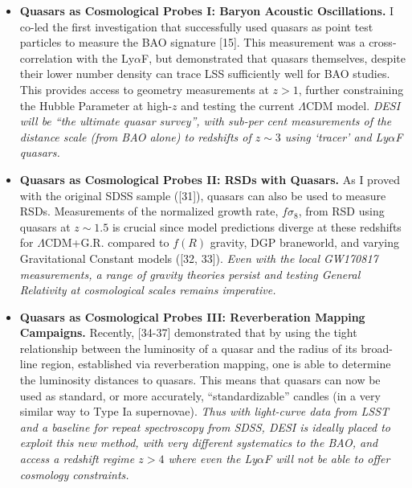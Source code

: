\begin{itemize}
\item{{\bf Quasars as Cosmological Probes {\sc I:} Baryon Acoustic
      Oscillations.} I co-led the first investigation that successfully used
    quasars as point test particles to measure the BAO signature
    [15]. This measurement was a cross-correlation with the Ly$\alpha$F,
    but demonstrated that quasars themselves, despite their lower number
    density can trace LSS sufficiently well for BAO studies. This
    provides access to geometry measurements at $z>1$, further
    constraining the Hubble Parameter at high-$z$ and testing the current
    $\Lambda$CDM model.  {\it DESI will be ``the ultimate quasar survey'',
      with sub-per cent measurements of the distance scale (from BAO alone)
      to redshifts of $z\sim3$ using `tracer' and Ly$\alpha$F quasars.}}
  
\item{{\bf Quasars as Cosmological Probes {\sc II:} RSDs with
      Quasars.}  As I proved with the original SDSS sample ([31]), quasars
    can also be used to measure RSDs.  Measurements of the normalized
    growth rate, $f\sigma_{8}$, from RSD using quasars at $z\sim1.5$ is
    crucial since model predictions diverge at these redshifts for
    $\Lambda$CDM+G.R. compared to $f(R)$ gravity, DGP braneworld, and varying
    Gravitational Constant models ([32, 33]). {\it Even with the local
      GW170817 measurements, a range of gravity theories persist and
      testing General Relativity at cosmological scales remains imperative.}}
  
\item{{\bf Quasars as Cosmological Probes {\sc III:} Reverberation
      Mapping Campaigns.}  Recently, [34-37] demonstrated that by using the
    tight relationship between the luminosity of a quasar and the radius
    of its broad-line region, established via reverberation mapping, one
    is able to determine the luminosity distances to quasars.  This means
    that quasars can now be used as standard, or more accurately,
    ``standardizable'' candles (in a very similar way to Type Ia
    supernovae). {\it Thus with light-curve data from LSST and a baseline
      for repeat spectroscopy from SDSS, DESI is ideally placed to exploit
      this new method, with very different systematics to the BAO, and
      access a redshift regime $z>4$ where even the Ly$\alpha$F will not be
      able to offer cosmology constraints.}}

\end{itemize}




